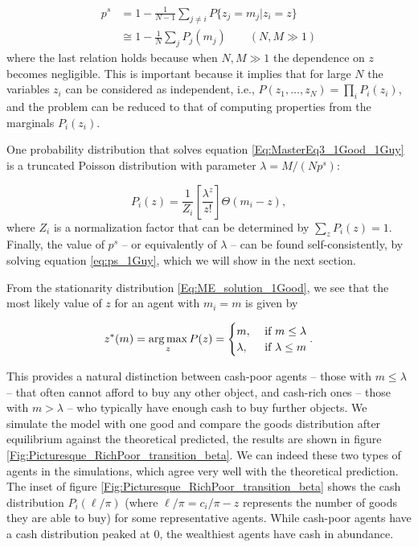 \begin{align}
p^s & =  1-\frac{1}{N-1}\sum_{j\neq i} P\{z_j=m_j|z_i=z\}\\
 & \cong  1-\frac{1}{N}\sum_{j} P_j(m_j)\qquad (N,M\gg 1)\label{eq:ps_1Guy}
\end{align}
where the last relation holds because when $N,M\gg 1$ the dependence on $z$ becomes negligible. This is important because it implies that for large $N$ the variables $z_i$ can be considered as independent, i.e., $P(z_1,\ldots, z_N)=\prod_i P_i(z_i)$, and the problem can be reduced to that of computing properties from the marginals $P_i(z_i)$.

One probability distribution that solves equation \eqref{Eq:MasterEq3_1Good_1Guy} is a truncated Poisson distribution with parameter $\lambda = M / (N p^s) $:

\begin{equation}
P_i(z) = \frac{1}{Z_i} \left[ \frac{\lambda^{z}}{z!}\right] \Theta\left(m_i - z \right),
\label{Eq:ME_solution_1Good}
\end{equation}
where $Z_i$ is a normalization factor that can be determined by $\sum_{z} P_i(z) = 1$. Finally, the value of $p^s$ -- or equivalently of $\lambda$ -- can be found self-consistently, by solving equation \eqref{eq:ps_1Guy}, which we will show in the next section.

From the stationarity distribution \eqref{Eq:ME_solution_1Good}, we see that the most likely value of $z$ for an agent with $m_i=m$ is given by

\begin{equation}
z^\ast(m)  = \operatorname*{arg\,max}_z  P(z)=
\begin{cases}
    m, & \text{ if } m \leq \lambda \\
    \lambda, & \text{ if } \lambda \leq m
  \end{cases}.
  \label{Eq:cases_ztyp}
\end{equation}

This provides a natural distinction between cash-poor agents -- those with $m \leq \lambda$ --  that often cannot afford to buy any other object, and cash-rich ones -- those with $m> \lambda$ --  who typically have enough cash to buy further objects. We simulate the model with one good and compare the goods distribution after equilibrium against the theoretical predicted, the results are shown in figure \ref{Fig:Picturesque_RichPoor_transition_beta}. We can indeed these two types of agents in the simulations, which agree very well with the theoretical prediction. The inset of figure \ref{Fig:Picturesque_RichPoor_transition_beta} shows the cash distribution $P_i(\ell/\pi)$ (where $\ell/\pi = c_i/\pi - z$ represents the number of goods they are able to buy) for some representative agents. While cash-poor agents have a cash distribution peaked at $0$, the wealthiest agents have cash in abundance.

